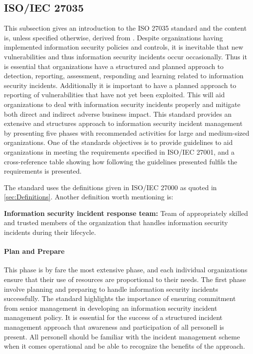 \subsection{\acs{ISO}/\acs{IEC} 27035}
This subsection gives an introduction to the ISO 27035 standard and the content is, unless specified otherwise, derived from \cite{ISO/IEC27035}. Despite organizations having implemented information security policies and controls, it is inevitable that new vulnerabilities and thus information security incidents occur occasionally. Thus it is essential that organizations have a structured and planned approach to detection, reporting, assessment, responding and learning related to information security incidents. Additionally it is important to have a planned approach to reporting of vulnerabilities that have not yet been exploited. This will aid organizations to deal with information security incidents properly and mitigate both direct and indirect adverse business impact. This standard provides an extensive and structures approach to information security incident management by presenting five phases with recommended activities for large and medium-sized organizations. One of the standards objectives is to provide guidelines to aid organizations in meeting the requirements specified in ISO/IEC 27001, and a cross-reference table showing how following the guidelines presented fulfils the requirements is presented.

The standard uses the definitions given in ISO/IEC 27000 as quoted in \ref{sec:Definitions}. Another definition worth mentioning is:

\textbf{Information security incident response team:} Team of appropriately skilled and trusted members of the organization that handles information security incidents during their lifecycle.

\paragraph{Plan and Prepare} This phase is by fare the most extensive phase, and each individual organizations ensure that their use of resources are proportional to their needs. The first phase involve planning and preparing to handle information security incidents successfully. The standard highlights the importance of ensuring commitment from senior management in developing an information security incident management policy. It is essential for the success of a structured incident management approach that awareness and participation of all personell is present. All personell should be familiar with the incident management scheme when it comes operational and be able to recognize the benefits of the approach. 


